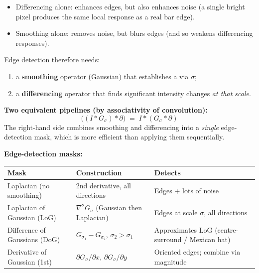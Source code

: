 \begin{thmbox}
\begin{itemize}
  \item Differencing alone: enhances edges, but also enhances noise (a single bright pixel produces the same local response as a real bar edge).
  \item Smoothing alone: removes noise, but blurs edges (and so weakens differencing responses).
\end{itemize}
Edge detection therefore needs:
\begin{enumerate}
  \item a \textbf{smoothing} operator (Gaussian) that establishes a  via $\sigma$;
  \item a \textbf{differencing} operator that finds significant intensity changes \emph{at that scale}.
\end{enumerate}
\end{thmbox}

\textbf{Two equivalent pipelines (by associativity of convolution):}
\[
\bigl((I \ast G_\sigma) \ast \partial\bigr) \;=\; I \ast (G_\sigma \ast \partial)
\]
The right-hand side combines smoothing and differencing into a \emph{single} edge-detection mask, which is more efficient than applying them sequentially.

\separator

\textbf{Edge-detection masks:}

\begin{center}
\renewcommand{\arraystretch}{1.3}
\begin{tabular}{@{} l p{4.5cm} p{5.5cm} @{}}
\toprule
\textbf{Mask} & \textbf{Construction} & \textbf{Detects} \\
\midrule
Laplacian (no smoothing) & 2nd derivative, all directions & Edges + lots of noise \\
Laplacian of Gaussian (LoG) & $\nabla^2 G_\sigma$ (Gaussian then Laplacian) & Edges at scale $\sigma$, all directions \\
Difference of Gaussians (DoG) & $G_{\sigma_1} - G_{\sigma_2}$, $\sigma_2 > \sigma_1$ & Approximates LoG (centre-surround / Mexican hat) \\
Derivative of Gaussian (1st) & $\partial G_\sigma / \partial x$, $\partial G_\sigma / \partial y$ & Oriented edges; combine via magnitude \\
\bottomrule
\end{tabular}
\end{center}

